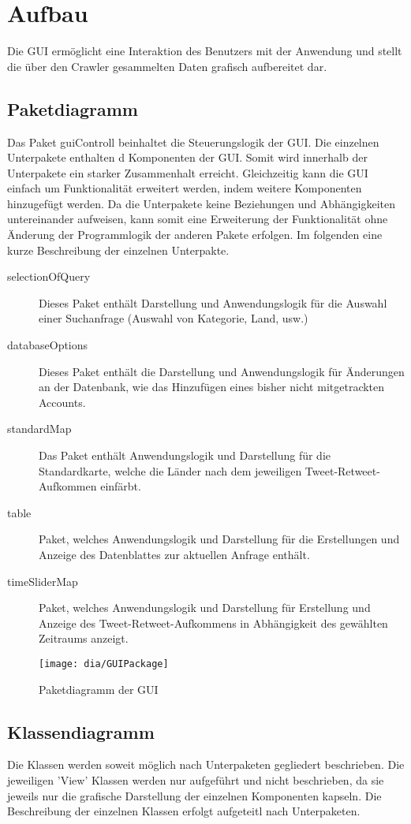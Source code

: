 \section{Aufbau}
Die GUI ermöglicht eine Interaktion des Benutzers mit der Anwendung und stellt die über den Crawler gesammelten Daten grafisch aufbereitet dar.\\
\subsection{Paketdiagramm}
Das Paket {guiControll} beinhaltet die Steuerungslogik der GUI. Die einzelnen Unterpakete enthalten d Komponenten der GUI. Somit wird innerhalb der Unterpakete ein starker Zusammenhalt erreicht. Gleichzeitig kann die GUI einfach um Funktionalität erweitert werden, indem weitere Komponenten hinzugefügt werden. Da die Unterpakete keine Beziehungen und Abhängigkeiten untereinander aufweisen, kann somit eine Erweiterung der Funktionalität ohne Änderung der Programmlogik der anderen Pakete erfolgen. 
Im folgenden eine kurze Beschreibung der einzelnen Unterpakte.
\begin{description}
		\item [selectionOfQuery] Dieses Paket enthält Darstellung und Anwendungslogik für die Auswahl einer Suchanfrage (Auswahl von Kategorie, Land, usw.)
		\item[databaseOptions] Dieses Paket enthält die Darstellung und Anwendungslogik für Änderungen an der Datenbank, wie das Hinzufügen eines bisher nicht mitgetrackten Accounts.
		
		\item [standardMap] Das Paket enthält Anwendungslogik und Darstellung für die Standardkarte, welche die Länder nach dem jeweiligen Tweet-Retweet-Aufkommen einfärbt.
		\item [table] Paket, welches Anwendungslogik und Darstellung für die Erstellungen und Anzeige des Datenblattes zur aktuellen Anfrage enthält.
		\item [timeSliderMap] Paket, welches Anwendungslogik und Darstellung für Erstellung und Anzeige des Tweet-Retweet-Aufkommens in Abhängigkeit des gewählten Zeitraums anzeigt.
\end{description}
\begin{figure}[h!]
	\centering
	\texttt{[image: dia/GUIPackage]}
	\caption{Paketdiagramm der GUI}
	\label{fig:GUI}
\end{figure}

\subsection{Klassendiagramm}
Die Klassen werden soweit möglich nach Unterpaketen gegliedert beschrieben. Die jeweiligen 'View' Klassen werden nur aufgeführt und nicht beschrieben, da sie jeweils nur die grafische Darstellung der einzelnen Komponenten kapseln. Die Beschreibung der einzelnen Klassen erfolgt aufgeteitl nach Unterpaketen.

